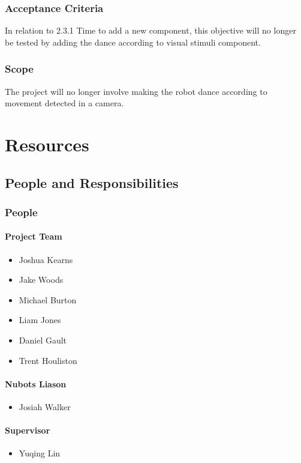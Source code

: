 \documentclass[english,12pt]{scrartcl}
\begin{document}
			\subsubsection{Acceptance Criteria}
				In relation to 2.3.1 Time to add a new component, this objective will no longer be tested by adding the dance according to visual stimuli component.

			\subsubsection{Scope}
				The project will no longer involve making the robot dance according to movement detected in a camera.

	\section{Resources}
		\subsection{People and Responsibilities}
			\subsubsection{People}
				\paragraph{Project Team}
					\begin{itemize}
						\item Joshua Kearns
						\item Jake Woods
						\item Michael Burton
						\item Liam Jones
						\item Daniel Gault
						\item Trent Houliston
					\end{itemize}
				\paragraph{Nubots Liason}
					\begin{itemize}
						\item Josiah Walker
					\end{itemize}
				\paragraph{Supervisor}
					\begin{itemize}
						\item Yuqing Lin
					\end{itemize}
\end{document}
